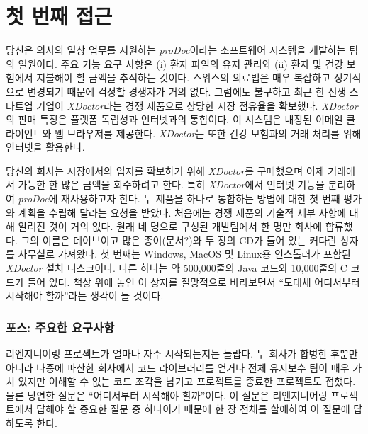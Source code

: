 \documentclass[a4paper,10pt,twoside]{book}
\begin{document}
	\renewcommand{\nnbb}[2]{} %
	\sloppy
\fi
\chapter{첫 번째 접근}

당신은 의사의 일상 업무를 지원하는 \emph{proDoc}이라는 소프트웨어 시스템을 개발하는 팀의 일원이다.
주요 기능 요구 사항은 (i) 환자 파일의 유지 관리와 (ii) 환자 및 건강 보험에서 지불해야 할 금액을 추적하는 것이다. 스위스의 의료법은 매우 복잡하고 정기적으로 변경되기 때문에 걱정할 경쟁자가 거의 없다. 그럼에도 불구하고 최근 한 신생 스타트업 기업이 \emph{XDoctor}라는 경쟁 제품으로 상당한 시장 점유율을 확보했다. \emph{XDoctor}의 판매 특징은 플랫폼 독립성과 인터넷과의 통합이다. 이 시스템은 내장된 이메일 클라이언트와 웹 브라우저를 제공한다. \emph{XDoctor}는 또한 건강 보험과의 거래 처리를 위해 인터넷을 활용한다.

당신의 회사는 시장에서의 입지를 확보하기 위해 \emph{XDoctor}를 구매했으며 이제 거래에서 가능한 한 많은 금액을 회수하려고 한다. 특히 \emph{XDoctor}에서 인터넷 기능을 분리하여 \emph{proDoc}에 재사용하고자 한다. 두 제품을 하나로 통합하는 방법에 대한 첫 번째 평가와 계획을 수립해 달라는 요청을 받았다. 처음에는 경쟁 제품의 기술적 세부 사항에 대해 알려진 것이 거의 없다. 원래 네 명으로 구성된 개발팀에서 한 명만 회사에 합류했다. 그의 이름은 데이브이고 많은 종이(문서?)와 두 장의 CD가 들어 있는 커다란 상자를 사무실로 가져왔다. 첫 번째는 Windows, MacOS 및 Linux용 인스톨러가 포함된 \emph{XDoctor} 설치 디스크이다. 다른 하나는 약 500,000줄의 Java 코드와 10,000줄의 C 코드가 들어 있다. 책상 위에 놓인 이 상자를 절망적으로 바라보면서 ``도대체 어디서부터 시작해야 할까''라는 생각이 들 것이다.

\subsection*{포스: 주요한 요구사항}

리엔지니어링 프로젝트가 얼마나 자주 시작되는지는 놀랍다. 두 회사가 합병한 후뿐만 아니라 나중에 파산한 회사에서 코드 라이브러리를 얻거나 전체 유지보수 팀이 매우 가치 있지만 이해할 수 없는 코드 조각을 남기고 프로젝트를 종료한 프로젝트도 접했다. 물론 당연한 질문은  ``어디서부터 시작해야 할까''이다. 이 질문은 리엔지니어링 프로젝트에서 답해야 할 중요한 질문 중 하나이기 때문에 한 장 전체를 할애하여 이 질문에 답하도록 한다.
\end{document}
